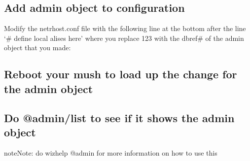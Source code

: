 \documentclass[letterpaper,10pt,english]{sphinxmanual}
\begin{document}
\begin{sphinxVerbatim}[commandchars=\\\{\}]
   
 
 
\end{sphinxVerbatim}


\subsection{Add admin object to configuration}
\label{\detokenize{gettingstarted:add-admin-object-to-configuration}}
\sphinxAtStartPar
Modify the netrhost.conf file with the following line at the bottom after the line ‘\# define local alises here’ where you replace 123 with the dbref\# of the admin object that you made:

\begin{sphinxVerbatim}[commandchars=\\\{\}]
 
\end{sphinxVerbatim}


\subsection{Reboot your mush to load up the change for the admin object}
\label{\detokenize{gettingstarted:reboot-your-mush-to-load-up-the-change-for-the-admin-object}}
\begin{sphinxVerbatim}[commandchars=\\\{\}]
\end{sphinxVerbatim}


\subsection{Do @admin/list to see if it shows the admin object}
\label{\detokenize{gettingstarted:do-admin-list-to-see-if-it-shows-the-admin-object}}
\begin{sphinxadmonition}{note}{Note:}
\sphinxAtStartPar
do wizhelp @admin for more information on how to use this
\end{sphinxadmonition}

\begin{sphinxVerbatim}[commandchars=\\\{\}]
\end{sphinxVerbatim}
\end{document}
